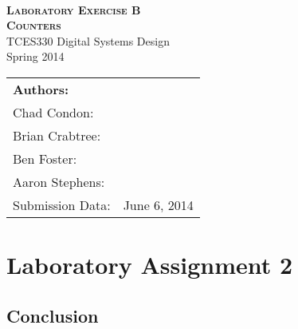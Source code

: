 \documentclass[12pt]{article}
\begin{document}
\begin{titlepage}
    \center
    \qquad\\[7cm]
    \textsc{\huge \bfseries Laboratory Exercise B} \\[.5cm]
    \textsc{\huge \bfseries Counters} \\[1.0cm]
    {\large TCES330 Digital Systems Design} \\[.5cm]
    {\large Spring 2014} \\[1.5cm]
    
    \begin{tabular}{ll}
        \multicolumn{2}{l}{\textbf{Authors:}}   \\
        Chad Condon:        & \underline{\hspace{5cm}} \\
        Brian Crabtree:     & \underline{\hspace{5cm}} \\
        Ben Foster:         & \underline{\hspace{5cm}} \\
        Aaron Stephens:     & \underline{\hspace{5cm}} \\
        Submission Data:    & June 6, 2014
    \end{tabular}
    
\end{titlepage}

\tableofcontents
\pagebreak

\section*{Laboratory Assignment 2} 

 \FloatBarrier \clearpage

 \FloatBarrier \clearpage

 \FloatBarrier \clearpage

 \FloatBarrier \clearpage

 \FloatBarrier \clearpage

\subsection*{Conclusion} 

\clearpage
\FloatBarrier 
\end{document}
